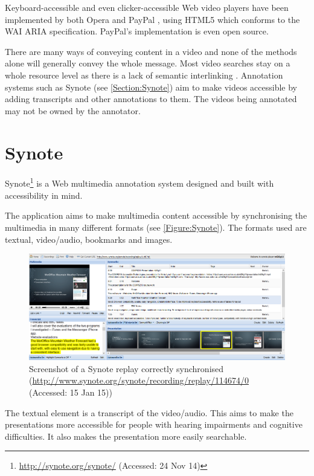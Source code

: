 Keyboard-accessible and even clicker-accessible Web video players have been implemented by both Opera \citep{OperaAccessibleVideo} and PayPal \citep{PayPalAccessibleVideo}, using \gls{HTML5} which conforms to the \gls{WAI} \gls{ARIA} specification. PayPal's implementation is even open source.

There are many ways of conveying content in a video and none of the methods alone will generally convey the whole message. Most video searches stay on a whole resource level as there is a lack of semantic interlinking \citep{eps273063}. Annotation systems such as Synote (see \autoref{Section:Synote}) aim to make videos accessible by adding transcripts and other annotations to them. The videos being annotated may not be owned by the annotator.

\section{Synote}
\label{Section:Synote}
Synote\footnote{\url{http://synote.org/synote/} (Accessed: 24 Nov 14)} is a Web multimedia annotation system designed and built with accessibility in mind.

The application aims to make multimedia content accessible by synchronising the multimedia in many different formats (see \autoref{Figure:Synote}). The formats used are textual, video/audio, bookmarks and images.

\begin{figure}[h!]
	\centering
	\includegraphics[scale=0.4]{../figures/synote_sync.png}
	\caption{\label{Figure:Synote} Screenshot of a Synote replay correctly synchronised (\url{http://www.synote.org/synote/recording/replay/114674/0} (Accessed: 15 Jan 15))}
\end{figure}

The textual element is a transcript of the video/audio. This aims to make the presentations more accessible for people with hearing impairments and cognitive difficulties. It also makes the presentation more easily searchable.

